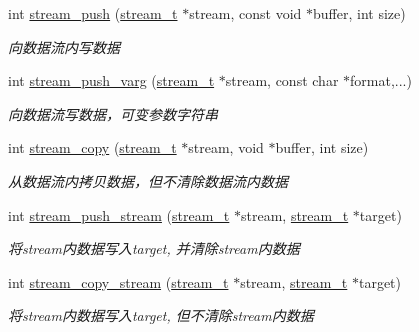 \begin{DoxyCompactItemize}
int \hyperlink{a00106_gae7e63ef142733eb3aea7401e28bc9a75_gae7e63ef142733eb3aea7401e28bc9a75}{stream\+\_\+push} (\hyperlink{a00050_a261dba04f46f5c59a68a05f69f5a65a8_a261dba04f46f5c59a68a05f69f5a65a8}{stream\+\_\+t} $\ast$stream, const void $\ast$buffer, int size)
\begin{DoxyCompactList}\small\item\em 向数据流内写数据 \end{DoxyCompactList}\item 
int \hyperlink{a00106_ga9631c1d90e0fad04b6ad04ccc5b95808_ga9631c1d90e0fad04b6ad04ccc5b95808}{stream\+\_\+push\+\_\+varg} (\hyperlink{a00050_a261dba04f46f5c59a68a05f69f5a65a8_a261dba04f46f5c59a68a05f69f5a65a8}{stream\+\_\+t} $\ast$stream, const char $\ast$format,...)
\begin{DoxyCompactList}\small\item\em 向数据流写数据，可变参数字符串 \end{DoxyCompactList}\item 
int \hyperlink{a00106_ga380555bf71ee99f6b2bb4f76738d507f_ga380555bf71ee99f6b2bb4f76738d507f}{stream\+\_\+copy} (\hyperlink{a00050_a261dba04f46f5c59a68a05f69f5a65a8_a261dba04f46f5c59a68a05f69f5a65a8}{stream\+\_\+t} $\ast$stream, void $\ast$buffer, int size)
\begin{DoxyCompactList}\small\item\em 从数据流内拷贝数据，但不清除数据流内数据 \end{DoxyCompactList}\item 
int \hyperlink{a00106_gad5336c2b89b6edea5f277d5ebc221e15_gad5336c2b89b6edea5f277d5ebc221e15}{stream\+\_\+push\+\_\+stream} (\hyperlink{a00050_a261dba04f46f5c59a68a05f69f5a65a8_a261dba04f46f5c59a68a05f69f5a65a8}{stream\+\_\+t} $\ast$stream, \hyperlink{a00050_a261dba04f46f5c59a68a05f69f5a65a8_a261dba04f46f5c59a68a05f69f5a65a8}{stream\+\_\+t} $\ast$target)
\begin{DoxyCompactList}\small\item\em 将stream内数据写入target, 并清除stream内数据 \end{DoxyCompactList}\item 
int \hyperlink{a00106_ga296aea89ba5bec6566e119855df3b18c_ga296aea89ba5bec6566e119855df3b18c}{stream\+\_\+copy\+\_\+stream} (\hyperlink{a00050_a261dba04f46f5c59a68a05f69f5a65a8_a261dba04f46f5c59a68a05f69f5a65a8}{stream\+\_\+t} $\ast$stream, \hyperlink{a00050_a261dba04f46f5c59a68a05f69f5a65a8_a261dba04f46f5c59a68a05f69f5a65a8}{stream\+\_\+t} $\ast$target)
\begin{DoxyCompactList}\small\item\em 将stream内数据写入target, 但不清除stream内数据 \end{DoxyCompactList}\item 

\end{DoxyCompactItemize}
